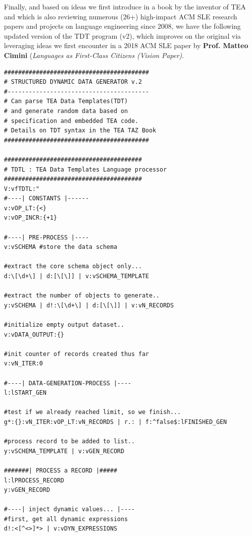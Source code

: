 \documentclass[a4paper, 18pt]{book} %
\begin{document}
\vspace{1em} 
 
 
 Finally, and based on ideas we first introduce in \cite{lutalo_2026_acmsle_reviewbook} a book by the inventor of TEA and which is also reviewing numerous (26+) high-impact ACM SLE research papers and projects on language engineering since 2008, we have the following updated version of the TDT program (v2), which improves on the original via leveraging ideas we first encounter in a 2018 ACM SLE paper by \textbf{Prof. Matteo Cimini} (\textit{Languages as First-Class Citizens (Vision Paper)}.
 
 
 
{
  \begin{tcolorbox}[teaterminalstyle, title=TEA Program: TDT Language and LOP Capabilities Demonstration, breakable]
  \begin{lstlisting}[language=TEA,breaklines=true,]
#########################################
# STRUCTURED DYNAMIC DATA GENERATOR v.2
#----------------------------------------
# Can parse TEA Data Templates(TDT)
# and generate random data based on
# specification and embedded TEA code.
# Details on TDT syntax in the TEA TAZ Book
#########################################

#######################################
# TDTL : TEA Data Templates Language processor
#######################################
V:vfTDTL:"
#----| CONSTANTS |------
v:vOP_LT:{<}
v:vOP_INCR:{+1}

#----| PRE-PROCESS |----
v:vSCHEMA #store the data schema

#extract the core schema object only...
d:\[\d+\] | d:[\[\]] | v:vSCHEMA_TEMPLATE

#extract the number of objects to generate..
y:vSCHEMA | d!:\[\d+\] | d:[\[\]] | v:vN_RECORDS

#initialize empty output dataset..
v:vDATA_OUTPUT:{}

#init counter of records created thus far
v:vN_ITER:0

#----| DATA-GENERATION-PROCESS |----
l:lSTART_GEN

#test if we already reached limit, so we finish...
g*:{}:vN_ITER:vOP_LT:vN_RECORDS | r.: | f:^false$:lFINISHED_GEN

#process record to be added to list..
y:vSCHEMA_TEMPLATE | v:vGEN_RECORD

#######| PROCESS a RECORD |#####
l:lPROCESS_RECORD
y:vGEN_RECORD

#----| inject dynamic values... |----
#first, get all dynamic expressions
d!:<[^<>]*> | v:vDYN_EXPRESSIONS


\end{lstlisting}
\end{tcolorbox}}
\end{document}
